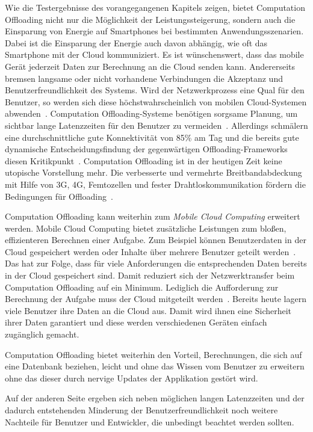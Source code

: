 \documentclass{sigchi}
\begin{document}
Wie die Testergebnisse des vorangegangenen Kapitels zeigen, bietet Computation Offloading nicht nur die Möglichkeit der Leistungssteigerung, sondern auch die Einsparung von Energie auf Smartphones bei bestimmten Anwendungsszenarien.
Dabei ist die Einsparung der Energie auch davon abhängig, wie oft das Smartphone mit der Cloud kommuniziert.
Es ist wünschenswert, dass das mobile Gerät jederzeit Daten zur Berechnung an die Cloud senden kann.
Andererseits bremsen langsame oder nicht vorhandene Verbindungen die Akzeptanz und Benutzerfreundlichkeit des Systems.
Wird der Netzwerkprozess eine Qual für den Benutzer, so werden sich diese höchstwahrscheinlich von mobilen Cloud-Systemen abwenden~\cite{o2}.
Computation Offloading-Systeme benötigen sorgsame Planung, um sichtbar lange Latenzzeiten für den Benutzer zu vermeiden~\cite{o12}.
Allerdings schmälern eine durchschnittliche gute Konnektivität von 85\% am Tag und die bereits gute dynamische Entscheidungsfindung der gegenwärtigen Offloading-Frameworks diesen Kritikpunkt~\cite{o2}.
Computation Offloading ist in der heutigen Zeit keine utopische Vorstellung mehr.
Die verbesserte und vermehrte Breitbandabdeckung mit Hilfe von 3G, 4G, Femtozellen und fester Draht\-los\-kom\-mu\-ni\-ka\-tion fördern die Bedingungen für Offloading~\cite{thoughtsoncloud}.

Computation Offloading kann weiterhin zum \emph{Mobile Cloud Computing} erweitert werden.
Mobile Cloud Computing bietet zusätzliche Leistungen zum bloßen, effizienteren Berechnen einer Aufgabe.
Zum Beispiel können Benutzerdaten in der Cloud gespeichert werden oder  Inhalte über mehrere Benutzer geteilt werden~\cite{o12}.
Das hat zur Folge, dass für viele Anforderungen die entsprechenden Daten bereits in der Cloud gespeichert sind.
Damit reduziert sich der Netzwerktransfer beim Computation Offloading auf ein Minimum.
Lediglich die Aufforderung zur Berechnung der Aufgabe muss der Cloud mitgeteilt werden~\cite{o12}.
Bereits heute lagern viele Benutzer ihre Daten an die Cloud aus.
Damit wird ihnen eine Sicherheit ihrer Daten garantiert und diese werden verschiedenen Geräten einfach zugänglich gemacht.

Computation Offloading bietet weiterhin den Vorteil, Berechnungen, die sich auf eine Datenbank beziehen, leicht und ohne das Wissen vom Benutzer zu erweitern ohne das dieser durch nervige Updates der Applikation gestört wird.

Auf der anderen Seite ergeben sich neben möglichen langen Latenzzeiten und der dadurch entstehenden Minderung der Benutzerfreundlichkeit noch weitere Nachteile für Benutzer und Entwickler, die unbedingt beachtet werden sollten.
\end{document}
